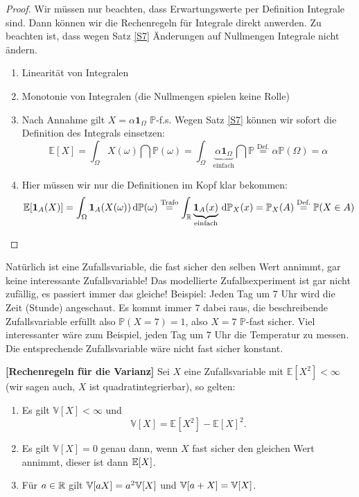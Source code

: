\begin{proof}
	Wir m\"ussen nur beachten, dass Erwartungswerte per Definition Integrale sind. Dann k\"onnen wir die Rechenregeln f\"ur Integrale direkt anwerden. Zu beachten ist, dass wegen Satz \ref{S7} \"Anderungen auf Nullmengen Integrale nicht \"andern.
	\begin{enumerate}[label=(\roman*)]
	\item Linearität von Integralen
	\item Monotonie von Integralen (die Nullmengen spielen keine Rolle)
	\item Nach Annahme gilt $X = \alpha \mathbf{1}_{\Omega}$ $\mathbb{P}$-f.s. Wegen Satz \ref{S7} k\"onnen wir sofort die Definition des Integrals einsetzen:
	\[ \mathbb{E}[X] = \int_{\Omega} X(\omega) \dint \mathbb{P}(\omega) = \int_{\Omega} \underbrace{\alpha \mathbf{1}_{\Omega}}_{\text{einfach}} \dint \mathbb{P} \overset{\text{Def.}}{=} \alpha \mathbb{P}(\Omega) = \alpha  \]
	\item Hier m\"ussen wir nur die Definitionen im Kopf klar bekommen:
	\begin{gather*}
		\mathbb{E}[\mathbf{1}_A(X)] = \int_{\Omega} \mathbf{1}_A(X(\omega)) \, \mathrm{d} \mathbb{P}(\omega) \overset{\text{Trafo}}{=} \int_{\mathbb{R}} \underbrace{\mathbf{1}_A(x)}_{\text{einfach}} \, \mathrm{d} \mathbb{P}_X(x) = \mathbb{P}_X(A) \overset{\text{Def.}}{=} \mathbb{P}(X \in A)
	\end{gather*}
\end{enumerate}
\end{proof}
Nat\"urlich ist eine Zufallsvariable, die fast sicher den selben Wert annimmt, gar keine interessante Zufallsvariable! Das modellierte Zufallsexperiment ist gar nicht zuf\"allig, es passiert immer das gleiche! Beispiel: Jeden Tag um 7 Uhr wird die Zeit (Stunde) angeschaut. Es kommt immer $7$ dabei raus, die beschreibende Zufallsvariable erf\"ullt also $\mathbb P(X=7)=1$, also $X=7$ $\mathbb P$-fast sicher. Viel interessanter w\"are zum Beispiel, jeden Tag um 7 Uhr die Temperatur zu messen. Die entsprechende Zufallsvariable w\"are nicht fast sicher konstant.
\begin{korollar}\label{vari}
 \textbf{[Rechenregeln f\"ur die Varianz]}
	Sei $X$ eine Zufallsvariable mit $ \mathbb{E}[X^2] < \infty$ (wir sagen auch, $X$ ist quadratintegrierbar), so gelten:
	\begin{enumerate}[label=(\roman*)]
		\item Es gilt $ \mathbb{V}[X] < \infty$ und \[ \mathbb{V}[X] = \mathbb{E}[X^2] - \mathbb{E}[X]^2. \]
		\item	Es gilt $ \mathbb{V}[X]= 0$ genau dann, wenn $X$ fast sicher den gleichen Wert annimmt, dieser ist dann $\mathbb{E}[X]$.
		\item F\"ur $a\in \mathbb{R}$ gilt $\mathbb{V}[aX]=a^2 \mathbb{V}[X]$ und $\mathbb{V}[a+X]=\mathbb{V}[X]$.	
\end{enumerate}
\end{korollar}

